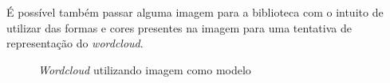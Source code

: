 É possível também passar alguma imagem para a biblioteca com o intuito de utilizar das formas e cores presentes na imagem para uma tentativa de representação do \textit{wordcloud}.

\begin{figure}[h]
	\centering
	\caption{\textit{Wordcloud} utilizando imagem como modelo}
	\vspace{-0.3cm}
	\label{fig:worddilma}
\end{figure}


